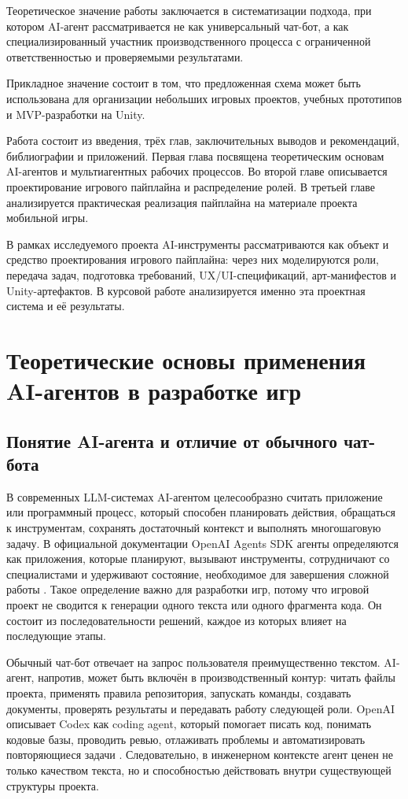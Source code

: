 \documentclass[a4paper,12pt]{report}
\begin{document}
Теоретическое значение работы заключается в систематизации подхода, при котором AI-агент рассматривается не как универсальный чат-бот, а как специализированный участник производственного процесса с ограниченной ответственностью и проверяемыми результатами.

Прикладное значение состоит в том, что предложенная схема может быть использована для организации небольших игровых проектов, учебных прототипов и MVP-разработки на Unity.

Работа состоит из введения, трёх глав, заключительных выводов и рекомендаций, библиографии и приложений. Первая глава посвящена теоретическим основам AI-агентов и мультиагентных рабочих процессов. Во второй главе описывается проектирование игрового пайплайна и распределение ролей. В третьей главе анализируется практическая реализация пайплайна на материале проекта мобильной игры.

В рамках исследуемого проекта AI-инструменты рассматриваются как объект и средство проектирования игрового пайплайна: через них моделируются роли, передача задач, подготовка требований, UX/UI-спецификаций, арт-манифестов и Unity-артефактов. В курсовой работе анализируется именно эта проектная система и её результаты.

\chapter{Теоретические основы применения AI-агентов в разработке игр}

\section{Понятие AI-агента и отличие от обычного чат-бота}

В современных LLM-системах AI-агентом целесообразно считать приложение или программный процесс, который способен планировать действия, обращаться к инструментам, сохранять достаточный контекст и выполнять многошаговую задачу. В официальной документации OpenAI Agents SDK агенты определяются как приложения, которые планируют, вызывают инструменты, сотрудничают со специалистами и удерживают состояние, необходимое для завершения сложной работы \cite{openai-agents-sdk}. Такое определение важно для разработки игр, потому что игровой проект не сводится к генерации одного текста или одного фрагмента кода. Он состоит из последовательности решений, каждое из которых влияет на последующие этапы.

Обычный чат-бот отвечает на запрос пользователя преимущественно текстом. AI-агент, напротив, может быть включён в производственный контур: читать файлы проекта, применять правила репозитория, запускать команды, создавать документы, проверять результаты и передавать работу следующей роли. OpenAI описывает Codex как coding agent, который помогает писать код, понимать кодовые базы, проводить ревью, отлаживать проблемы и автоматизировать повторяющиеся задачи \cite{openai-codex}. Следовательно, в инженерном контексте агент ценен не только качеством текста, но и способностью действовать внутри существующей структуры проекта.
\end{document}
